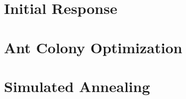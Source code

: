 \cleardoublepage
\label{sec:os_implementation}




\section{Initial Response}
\label{sec:initial_response}


\section{Ant Colony Optimization}
\label{sec:aco_implementation}


\section{Simulated Annealing}
\label{sec:sa_implementation}

